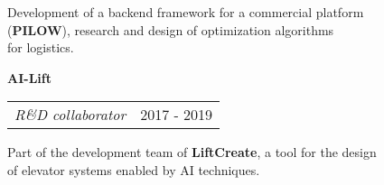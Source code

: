 \begin{list1}
	\item[] Development of a backend framework for a commercial platform\\
	(\textbf{PILOW}), research and design of optimization algorithms\\
	for logistics.
\end{list1}


{\bf{AI-Lift}}\\
\begin{tabular}{@{}p{4in}p{2in}}
	\textit{R\&D collaborator}  & 2017 - 2019\\
\end{tabular}

\begin{list1}
	\item[] Part of the development team of \textbf{LiftCreate}, a tool for the design\\
	of elevator systems enabled by AI techniques.
\end{list1}

\vfill
